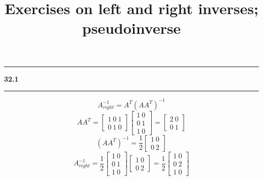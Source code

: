\documentclass[11pt]{article}
\newcommand\question[2]{\vspace{.25in}\hrule\textbf{#1 #2}\vspace{.5em}\hrule\vspace{.10in}}
\begin{document}
\raggedright
\newcommand\NAME{Haiying Cui}  %
\newcommand\ANDREWID{Christy}     %
\newcommand\HWNUM{32}              %

\title{Exercises on left and right inverses; pseudoinverse}
\maketitle

\question{32.1}{}
$$A^{-1}_{right} = A^T(AA^T)^{-1}$$
$$AA^T = \begin{bmatrix} 1 \ 0 \ 1 \\ 0 \ 1 \ 0 \end{bmatrix}\begin{bmatrix} 1 \ 0 \\ 0 \ 1 \\ 1 \ 0 \end{bmatrix} = \begin{bmatrix} 2 \ 0 \\ 0 \ 1 \end{bmatrix}$$
$$(AA^T)^{-1} = \frac{1}{2}\begin{bmatrix} 1 \ 0 \\ 0 \ 2 \end{bmatrix}$$
$$A^{-1}_{right} = \frac{1}{2}\begin{bmatrix} 1 \ 0 \\ 0 \ 1 \\ 1 \ 0 \end{bmatrix}\begin{bmatrix} 1 \ 0 \\ 0 \ 2 \end{bmatrix} = \frac{1}{2}\begin{bmatrix} 1 \ 0 \\ 0 \ 2 \\ 1 \ 0 \end{bmatrix}$$
\end{document}

